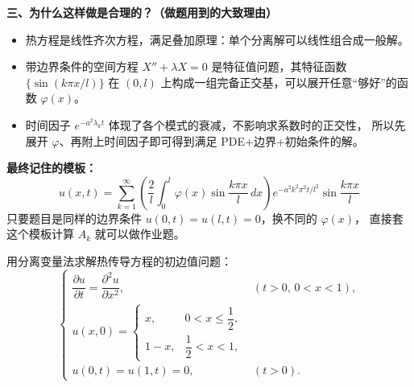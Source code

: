 \textbf{三、为什么这样做是合理的？（做题用到的大致理由）}
\begin{itemize}
  \item 热方程是线性齐次方程，满足叠加原理：单个分离解可以线性组合成一般解。
  \item 带边界条件的空间方程 $X''+\lambda X=0$ 是特征值问题，其特征函数
        $\{\sin(k\pi x/l)\}$ 在 $(0,l)$ 上构成一组完备正交基，可以展开任意“够好”的函数
        $\varphi(x)$。
  \item 时间因子 $e^{-a^2\lambda_k t}$ 体现了各个模式的衰减，不影响求系数时的正交性，
        所以先展开 $\varphi$、再附上时间因子即可得到满足 PDE+边界+初始条件的解。
\end{itemize}

\textbf{最终记住的模板：}
\[
\boxed{\;
u(x,t)=\sum_{k=1}^\infty
\left(\frac{2}{l}\int_0^l \varphi(x)\sin\frac{k\pi x}{l}\,dx\right)
e^{-a^2 k^2\pi^2 t/l^2}\sin\frac{k\pi x}{l}
\;}
\]
只要题目是同样的边界条件 $u(0,t)=u(l,t)=0$，换不同的 $\varphi(x)$，
直接套这个模板计算 $A_k$ 就可以做作业题。
\begin{homework}[2]
用分离变量法求解热传导方程的初边值问题：
\[
\begin{cases}
\dfrac{\partial u}{\partial t}
= \dfrac{\partial^2 u}{\partial x^2}, & (t>0,\,0<x<1),\\[6pt]
u(x,0)=
\begin{cases}
x, & 0<x\le\dfrac{1}{2},\\[4pt]
1-x, & \dfrac{1}{2}<x<1,
\end{cases}\\[10pt]
u(0,t)=u(1,t)=0, & (t>0).
\end{cases}
\]
\end{homework}
